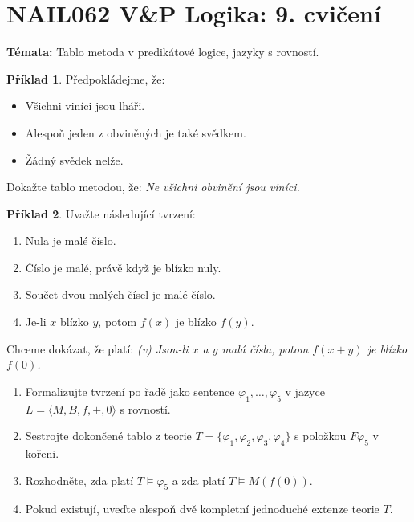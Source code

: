 \documentclass[a4paper]{article}
\theoremstyle{plain}
\theoremstyle{definition}
\newtheorem{problem}{Příklad}
\begin{document}
\section*{NAIL062 V\&P Logika: 9. cvičení}

\textbf{Témata:}
Tablo metoda v predikátové logice, jazyky s rovností.


\medskip\begin{problem}
    Předpokládejme, že:
    \begin{itemize}\it
    \item Všichni viníci jsou lháři.
    \item Alespoň jeden z obviněných je také svědkem.
    \item Žádný svědek nelže.
    \end{itemize}
    Dokažte tablo metodou, že: {\it Ne všichni obvinění jsou viníci.}
\end{problem} 
    

\medskip\begin{problem}
Uvažte následující tvrzení:
\begin{enumerate}[label=(\roman*)] \it 
    \item Nula je malé číslo.
    \item Číslo je malé, právě když je blízko nuly.
    \item Součet dvou malých čísel je malé číslo.
    \item Je-li $x$ blízko $y$, potom $f(x)$ je blízko $f(y)$.
\end{enumerate}
Chceme dokázat, že platí: {\it (v) Jsou-li $x$ a $y$ malá čísla, potom $f(x+y)$ je blízko $f(0)$.}

\begin{enumerate}
\item Formalizujte tvrzení po řadě jako sentence $\varphi_1,\dots,\varphi_5$ v jazyce $L=\langle M,B,f,+,0\rangle$ s rovností.
\item Sestrojte dokončené tablo z teorie $T=\{\varphi_1,\varphi_2,\varphi_3,\varphi_4\}$ s položkou $F\varphi_5$ v kořeni.
\item Rozhodněte, zda platí $T\models \varphi_5$ a zda platí $T\models M(f(0))$.

\item Pokud existují, uveďte alespoň dvě kompletní jednoduché extenze teorie $T$.
\end{enumerate}
\end{problem}
\end{document}
